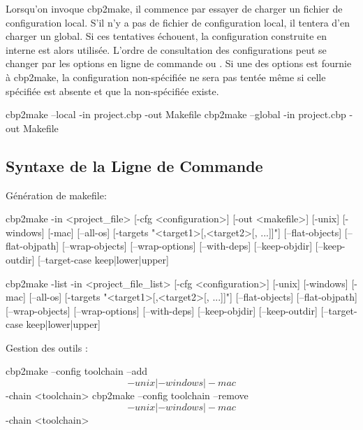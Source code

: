 Lorsqu'on invoque cbp2make, il commence par essayer de charger un fichier de configuration local. S'il n'y a pas de fichier de configuration local, il tentera d'en charger un global. Si ces tentatives échouent, la configuration construite en interne est alors utilisée. L'ordre de consultation des configurations peut se changer par les options en ligne de commande  ou . Si une des options est fournie à cbp2make, la configuration non-spécifiée ne sera pas tentée même si celle spécifiée est absente et que la non-spécifiée existe.


\begin{code}
cbp2make -in project.cbp -out Makefile}
\end{code}


\begin{code}
cbp2make --local -in project.cbp -out Makefile
cbp2make --global -in project.cbp -out Makefile
\end{code}

\subsection{Syntaxe de la Ligne de Commande}

Génération de makefile:
\begin{code}
cbp2make -in <project_file> [-cfg <configuration>] [-out <makefile>]
[-unix] [-windows] [-mac] [--all-os] [-targets "<target1>[,<target2>[, ...]]"]
[--flat-objects] [--flat-objpath] [--wrap-objects] [--wrap-options]
[--with-deps] [--keep-objdir] [--keep-outdir] [--target-case keep|lower|upper]

cbp2make -list -in <project_file_list> [-cfg <configuration>]
[-unix] [-windows] [-mac] [--all-os] [-targets "<target1>[,<target2>[, ...]]"]
[--flat-objects] [--flat-objpath] [--wrap-objects] [--wrap-options]
[--with-deps] [--keep-objdir] [--keep-outdir] [--target-case keep|lower|upper]
\end{code}

\begin{samepage}
Gestion des outils :
\begin{code}
cbp2make --config toolchain --add \[-unix|-windows|-mac\] -chain <toolchain>
cbp2make --config toolchain --remove \[-unix|-windows|-mac\] -chain <toolchain>
\end{code}
\end{samepage}

